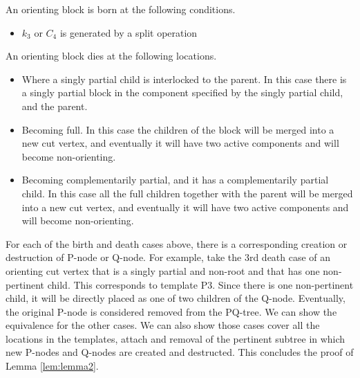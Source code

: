 \documentclass[a4]{jgaa-art}
\begin{document}
\begin{appendices}
   An orienting block is born at the following conditions.
   \begin{itemize}
   \item $k_3$ or $C_4$ is generated by a split operation
   \end{itemize}

   An orienting block dies at the following locations.
   \begin{itemize}
   \item Where a singly partial child is interlocked to the parent. In this case there is a singly
   partial block in the component specified by the singly partial child, and the parent.
   \item Becoming full. In this case the children of the block will be merged into a new cut vertex,
   and eventually it will have two active components and will become non-orienting.

   \item Becoming complementarily partial, and it has a complementarily partial child.
   In this case all the full children together with the parent will be merged into a new cut vertex,
   and eventually it will have two active components and will become non-orienting.
   \end{itemize}

   For each of the birth and death cases above, there is a corresponding creation or destruction of 
   P-node or Q-node. For example, take the 3rd death case of an orienting cut vertex that is a singly
   partial and non-root and that has one non-pertinent child. This corresponds to template P3.
   Since there is one non-pertinent child, it will be directly placed as one of two children of the Q-node.
   Eventually, the original P-node is considered removed from the PQ-tree.
   We can show the equivalence for the other cases. We can also show those cases cover all the locations
   in the templates, attach and removal of the pertinent subtree in which new P-nodes and Q-nodes are created
   and destructed. This concludes the proof of Lemma \ref{lem:lemma2}.


\end{appendices}
\end{document}
